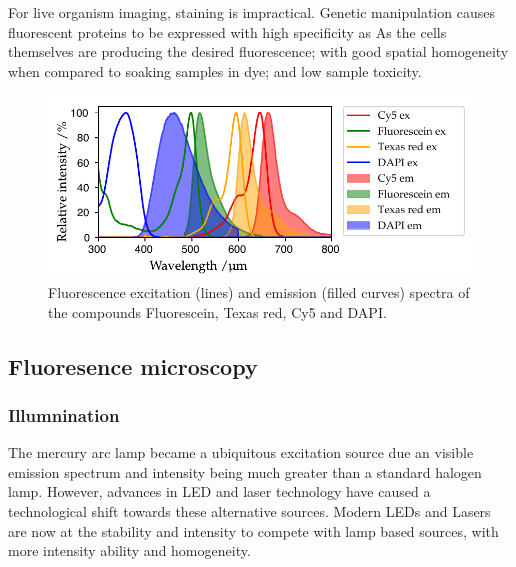 For live organism imaging, staining is impractical.
Genetic manipulation causes fluorescent proteins to be expressed with high specificity as
As the cells themselves are producing the desired fluorescence; with good spatial homogeneity when compared to soaking samples in dye; and low sample toxicity.


\begin{figure}
    \centering
    \includegraphics{./fluorphores/++multi_plot.pdf}
    \caption{Fluorescence excitation (lines) and emission (filled curves) spectra of the compounds Fluorescein, Texas red, Cy5 and DAPI.}
    \label{fig:fluo_spectra}
\end{figure}

\subsection{Fluoresence microscopy}

\subsubsection{Illumnination}

The mercury arc lamp became a ubiquitous excitation source due an visible emission spectrum and intensity being much greater than a standard halogen lamp.
However, advances in LED and laser technology have caused a technological shift towards these alternative sources.
Modern LEDs and Lasers are now at the stability and intensity to compete with lamp based sources, with more intensity ability and homogeneity.

